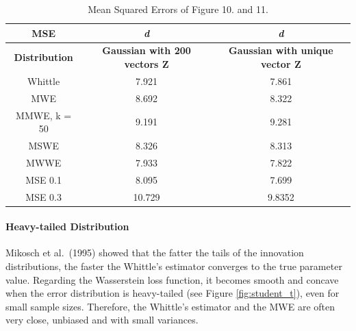 \documentclass[
  11pt,
]{article}
\begin{document}
\begin{table}[h]
\centering
\begin{tabular}{|c|c|c|}
\hline
\textbf{MSE}          & \textit{\textbf{d}}                  & \textit{\textbf{d}}                    \\ \hline
\textbf{Distribution} & \textbf{Gaussian with 200 vectors Z} & \textbf{Gaussian with unique vector Z} \\ \hline
Whittle               & 7.921                                & 7.861                                  \\ \hline
MWE                   & 8.692                                & 8.322                                  \\ \hline
MMWE, k = 50          & 9.191                                & 9.281                                  \\ \hline
MSWE                  & 8.326                                & 8.313                                  \\ \hline
MWWE                  & 7.933                                & 7.822                                  \\ \hline
MSE 0.1               & 8.095                                & 7.699                                  \\ \hline
MSE 0.3               & 10.729                               & 9.8352                                 \\ \hline
\end{tabular}
\caption{Mean Squared Errors of Figure 10. and 11.}
\label{tab:farima_mse_gaussian}
\end{table}

\hypertarget{heavy-tailed-distribution}{%
\paragraph{Heavy-tailed Distribution}\label{heavy-tailed-distribution}}

\hfill\break

Mikosch et al.~(1995) showed that the fatter the tails of the innovation
distributions, the faster the Whittle's estimator converges to the true
parameter value. Regarding the Wasserstein loss function, it becomes
smooth and concave when the error distribution is heavy-tailed (see
Figure \ref{fig:student_t}), even for small sample sizes. Therefore, the
Whittle's estimator and the MWE are often very close, unbiased and with
small variances.
\end{document}
